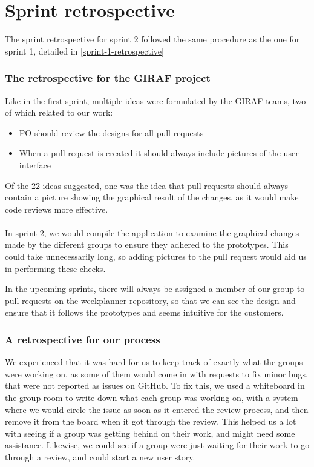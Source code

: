 \section{Sprint retrospective}\label{sec:sprint-2-retrospective}
The sprint retrospective for sprint 2 followed the same procedure as the one for sprint 1, detailed in \autoref{sprint-1-retrospective}

\subsubsection{The retrospective for the GIRAF project}
Like in the first sprint, multiple ideas were formulated by the GIRAF teams, two of which related to our work:
\begin{itemize}
    \item PO should review the designs for all pull requests
    \item When a pull request is created it should always include pictures of the user interface
\end{itemize}
\noindent

Of the 22 ideas suggested, one was the idea that pull requests should always contain a picture showing the graphical result of the changes, as it would make code reviews more effective.
\\\\
In sprint 2, we would compile the application to examine the graphical changes made by the different groups to ensure they adhered to the prototypes.
This could take unnecessarily long, so adding pictures to the pull request would aid us in performing these checks.

In the upcoming sprints, there will always be assigned a member of our group to pull requests on the weekplanner repository, so that we can see the design and ensure that it follows the prototypes and seems intuitive for the customers.

\subsubsection{A retrospective for our process}
We experienced that it was hard for us to keep track of exactly what the groups were working on, as some of them would come in with requests to fix minor bugs, that were not reported as issues on GitHub.
To fix this, we used a whiteboard in the group room to write down what each group was working on, with a system where we would circle the issue as soon as it entered the review process, and then remove it from the board when it got through the review.
This helped us a lot with seeing if a group was getting behind on their work, and might need some assistance.
Likewise, we could see if a group were just waiting for their work to go through a review, and could start a new user story.
